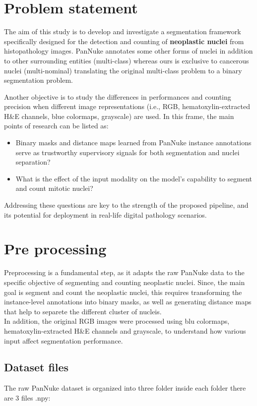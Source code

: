 \documentclass[target=bach,aauheader=,style=]{thud}
\begin{document}
\section{Problem statement} The aim of this study is to develop and investigate a segmentation framework specifically designed for the detection and counting of \textbf{neoplastic nuclei} from histopathology images. PanNuke annotates some other forms of nuclei in addition to other surrounding entities (multi-class) whereas ours is exclusive to cancerous nuclei (multi-nominal) translating the original multi-class problem to a binary segmentation problem.

Another objective is to study the differences in performances and counting precision when different image representations (i.e., RGB, hematoxylin-extracted H\&E channels, blue colormaps, grayscale) are used. In this frame, the main points of research can be listed as: \begin{itemize} \item Binary masks and distance maps learned from PanNuke instance annotations serve as trustworthy supervisory signals for both segmentation and nuclei separation? \item What is the effect of the input modality on the model's capability to segment and count mitotic nuclei? \end{itemize}

Addressing these questions are key to the strength of the proposed pipeline, and its potential for deployment in real-life digital pathology scenarios.

\section{Pre processing}
Preprocessing is a fundamental step, as it adapts the raw PanNuke data to the specific objective of segmenting and counting neoplastic nuclei. Since, the main goal is segment and count the neoplastic nuclei, this requires transforming the instance-level annotations into binary masks, as well as generating distance maps that help to separete the different cluster of nucleis.\\
In addition, the original RGB images were processed using blu colormaps, hematoxylin-extracted H\&E channels and grayscale, to understand how various input affect segmentation performance.
\subsection{Dataset files}
\label{sec:datafiles}
The raw PanNuke dataset is organized into three folder inside each folder there are 3 files .npy:
\end{document}
